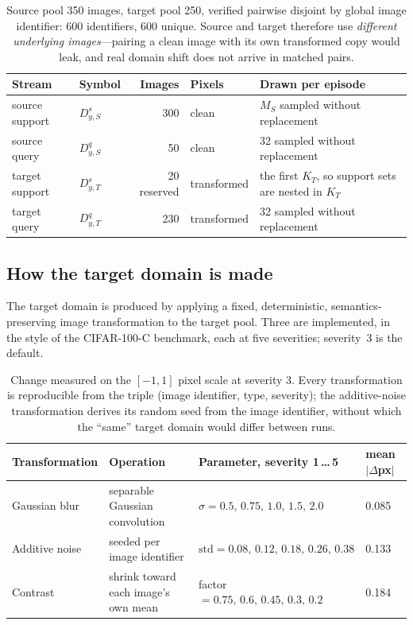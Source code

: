 \documentclass[11pt]{article}
\newcommand{\Dss}{D^{s}_{y,S}}
\newcommand{\Dqs}{D^{q}_{y,S}}
\newcommand{\Dst}{D^{s}_{y,T}}
\newcommand{\Dqt}{D^{q}_{y,T}}
\newcommand{\KT}{K_{T}}
\newcommand{\MS}{M_{S}}
\begin{document}
\begin{table}[htbp]
\centering\small
\begin{tabular}{@{}llrl p{5.2cm}@{}}
\toprule
\textbf{Stream} & \textbf{Symbol} & \textbf{Images} & \textbf{Pixels} & \textbf{Drawn per episode} \\
\midrule
source support & $\Dss$ & 300 & clean       & $\MS$ sampled without replacement \\
source query   & $\Dqs$ & 50  & clean       & 32 sampled without replacement \\
target support & $\Dst$ & 20 reserved & transformed & the first $\KT$, so support sets are
                                                       nested in $\KT$ \\
target query   & $\Dqt$ & 230 & transformed & 32 sampled without replacement \\
\bottomrule
\end{tabular}
\caption{Source pool 350 images, target pool 250, verified pairwise disjoint by global image
identifier: 600 identifiers, 600 unique. Source and target therefore use \emph{different
underlying images}---pairing a clean image with its own transformed copy would leak, and real
domain shift does not arrive in matched pairs.}
\end{table}

\subsection{How the target domain is made}

The target domain is produced by applying a fixed, deterministic, semantics-preserving image
transformation to the target pool. Three are implemented, in the style of the CIFAR-100-C
benchmark, each at five severities; severity~3 is the default.

\begin{table}[htbp]
\centering\footnotesize
\begin{tabular}{@{}llll@{}}
\toprule
\textbf{Transformation} & \textbf{Operation} & \textbf{Parameter, severity 1\,\ldots\,5} & \textbf{mean $|\Delta$px$|$} \\
\midrule
Gaussian blur     & separable Gaussian convolution     & $\sigma=0.5,\,0.75,\,1.0,\,1.5,\,2.0$ & 0.085 \\
Additive noise    & seeded per image identifier        & $\mathrm{std}=0.08,\,0.12,\,0.18,\,0.26,\,0.38$ & 0.133 \\
Contrast          & shrink toward each image's own mean & factor $=0.75,\,0.6,\,0.45,\,0.3,\,0.2$ & 0.184 \\
\bottomrule
\end{tabular}
\caption{Change measured on the $[-1,1]$ pixel scale at severity 3. Every transformation is
reproducible from the triple (image identifier, type, severity); the additive-noise transformation
derives its random seed from the image identifier, without which the ``same'' target domain would
differ between runs.}
\end{table}
\end{document}
